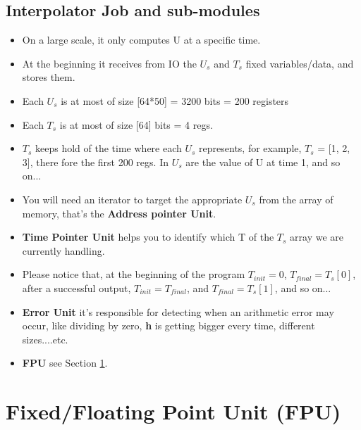 \documentclass[12pt]{report}
\begin{document}
\subsection{Interpolator Job and sub-modules}
\begin{itemize}
    \item On a large scale, it only computes U at a specific time.
    \item At the beginning it receives from IO the $U_s$ and $T_s$ fixed variables/data, and stores them.
    \item Each $U_s$ is at most of size [64*50] = 3200 bits = 200 registers
    \item Each $T_s$ is at most of size [64] bits = 4 regs.
    \item $T_s$ keeps hold of the time where each $U_s$ represents, for example, $T_s$ = [1, 2, 3], there fore the first 200 regs. In $U_s$ are the value of U at time 1, and so on... 
    \item You will need an iterator to target the appropriate $U_s$ from the array of memory, that's the \textbf{Address pointer Unit}.
    \item \textbf{Time Pointer Unit} helps you to identify which T of the $T_s$ array we are currently handling.
    \item Please notice that, at the beginning of the program $T_{init} = 0$, $T_{final} = T_s[0]$, after a successful output, $T_{init} = T_{final}$, and $T_{final} = T_s[1]$, and so on...
    \item \textbf{Error Unit} it's responsible for detecting when an arithmetic error may occur, like dividing by zero, \textbf{h} is getting bigger every time, different sizes....etc.
    \item \textbf{FPU} see Section \ref{sec:fpu}.
\end{itemize}

\section{Fixed/Floating Point Unit (FPU)}
\label{sec:fpu}
\end{document}
